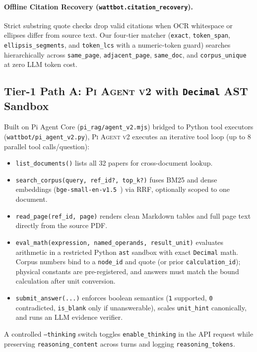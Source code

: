 \documentclass[sigconf,nonacm]{acmart}
\newcommand{\code}[1]{\texttt{\small #1}}
\begin{document}
\paragraph{Offline Citation Recovery (\code{wattbot.citation\_recovery}).}
Strict substring quote checks drop valid citations when OCR whitespace or ellipses differ from source text. Our four-tier matcher (\code{exact}, \code{token\_span}, \code{ellipsis\_segments}, and \code{token\_lcs} with a numeric-token guard) searches hierarchically across \code{same\_page}, \code{adjacent\_page}, \code{same\_doc}, and \code{corpus\_unique} at zero LLM token cost.

\subsection{Tier-1 Path A: \textsc{Pi Agent v2} with \code{Decimal} AST Sandbox}
\label{sec:piv2}

Built on Pi Agent Core (\code{pi\_rag/agent\_v2.mjs}) bridged to Python tool executors (\code{wattbot/pi\_agent\_v2.py}), \textsc{Pi Agent v2} executes an iterative tool loop (up to 8 parallel tool calls/question):
\begin{itemize}
  \item \code{list\_documents()} lists all 32 papers for cross-document lookup.
  \item \code{search\_corpus(query, ref\_id?, top\_k?)} fuses BM25 and dense embeddings (\code{bge-small-en-v1.5}~\cite{xiao2024bge}) via RRF, optionally scoped to one document.
  \item \code{read\_page(ref\_id, page)} renders clean Markdown tables and full page text directly from the source PDF.
  \item \code{eval\_math(expression, named\_operands, result\_unit)} evaluates arithmetic in a restricted Python \code{ast} sandbox with exact \code{Decimal} math. Corpus numbers bind to a \code{node\_id} and quote (or prior \code{calculation\_id}); physical constants are pre-registered, and answers must match the bound calculation after unit conversion.
  \item \code{submit\_answer(...)} enforces boolean semantics (\code{1} supported, \code{0} contradicted, \code{is\_blank} only if unanswerable), scales \code{unit\_hint} canonically, and runs an LLM evidence verifier.
\end{itemize}
A controlled \code{--thinking} switch toggles \code{enable\_thinking} in the API request while preserving \code{reasoning\_content} across turns and logging \code{reasoning\_tokens}.
\end{document}
